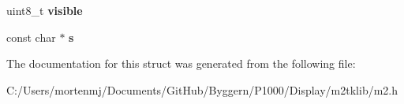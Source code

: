 \begin{DoxyCompactItemize}
\item 
\hypertarget{struct__m2__gfx__arg_aa90045e5fdfe6598752d0c57debe52cf}{uint8\-\_\-t {\bfseries visible}}\label{struct__m2__gfx__arg_aa90045e5fdfe6598752d0c57debe52cf}

\item 
\hypertarget{struct__m2__gfx__arg_aeefe893cbd5d25bef03517c799b9cb09}{const char $\ast$ {\bfseries s}}\label{struct__m2__gfx__arg_aeefe893cbd5d25bef03517c799b9cb09}

\end{DoxyCompactItemize}


The documentation for this struct was generated from the following file\-:\begin{DoxyCompactItemize}
\item 
C\-:/\-Users/mortenmj/\-Documents/\-Git\-Hub/\-Byggern/\-P1000/\-Display/m2tklib/m2.\-h\end{DoxyCompactItemize}
